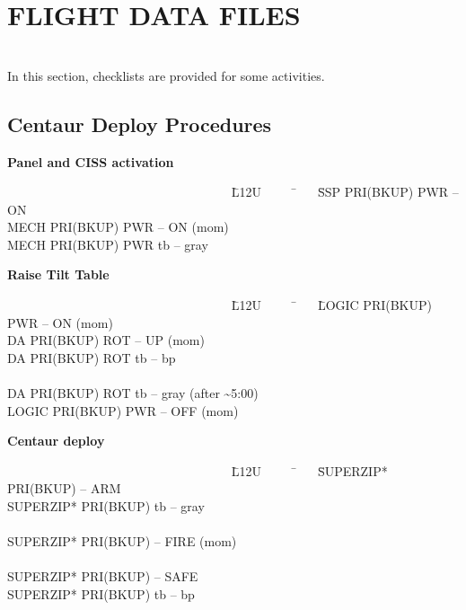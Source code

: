 \documentclass[Space_Shuttle_Ultra_Manual.tex]{subfiles}
\begin{document}
\section{FLIGHT DATA FILES}
\begin{multicols*}{2}
\label{sec:flight-data-files}
\renewcommand{\cfttoctitlefont}{\bf}
\localtableofcontents
\noindent
\\
In this section, checklists are provided for some activities.
\end{multicols*}

\subsection{Centaur Deploy Procedures}
{\fontsize{12pt}{14pt}\selectfont
\vspace{12pt}
\hspace{100pt}\textbf{Panel and CISS activation}
\begin{tabbing}
~~~~~~~~~~~~~~~~~~~~~~~~~~~~~~~~~~~ \= L12U~~~~~ \= ~~ \= SSP PRI(BKUP) PWR -- ON\\
\>\>\> MECH PRI(BKUP) PWR -- ON (mom)\\
\>\>\> MECH PRI(BKUP) PWR tb -- gray\\
\end{tabbing}

\noindent
\hspace{100pt}\textbf{Raise Tilt Table}
\begin{tabbing}
~~~~~~~~~~~~~~~~~~~~~~~~~~~~~~~~~~~ \= L12U~~~~~ \= ~~ \= LOGIC PRI(BKUP) PWR -- ON (mom)\\
\>\>\> DA PRI(BKUP) ROT -- UP (mom)\\
\>\>\> DA PRI(BKUP) ROT tb -- bp\\\\
\>\>\> DA PRI(BKUP) ROT tb -- gray (after \textasciitilde5:00)\\
\>\>\> LOGIC PRI(BKUP) PWR -- OFF (mom)\\
\end{tabbing}

\noindent
\hspace{100pt}\textbf{Centaur deploy}
\begin{tabbing}
~~~~~~~~~~~~~~~~~~~~~~~~~~~~~~~~~~~ \= L12U~~~~~ \= ~~ \= SUPERZIP* PRI(BKUP) -- ARM\\
\>\>\> SUPERZIP* PRI(BKUP) tb -- gray\\\\
\>\>\> SUPERZIP* PRI(BKUP) -- FIRE (mom)\\\\
\>\>\> SUPERZIP* PRI(BKUP) -- SAFE\\
\>\>\> SUPERZIP* PRI(BKUP) tb -- bp\\
\end{tabbing}

}
\end{document}
